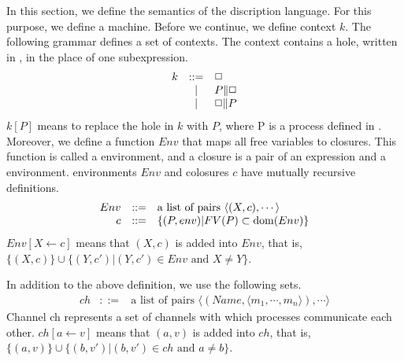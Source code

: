 In this section, we define the semantics of the discription language.
For this purpose, we define a machine.
Before we continue, we define context \(k\).
The following grammar defines a set of contexts.
The context contains a hole, written in \hole, in the place of one subexpression.
  \begin{displaymath}
    \begin{array}{lcl}
k     &::=& \mbox{$\Box$} \\
      & | & P\|\mbox{$\Box$}\\
      & | & \mbox{$\Box$}\|P
    \end{array}
  \end{displaymath}
$k[P]$ means to replace the hole in $k$ with $P$, where P is a process defined in .
Moreover, we define a function $Env$ that maps all free variables to closures.
This function is called a environment, and a closure is a pair of an expression and a environment.
environments \(Env\) and colosures \(c\) have mutually recursive definitions.
  \begin{displaymath}
    \begin{array}{rcl}
Env &::=& \mbox{a list of pairs }\langle(X,c),\cdots\rangle\\
c &::=& \{(P,env)|FV(P)\subset \mathop{\mathrm{dom}}\nolimits(Env)\}\\
    \end{array}
  \end{displaymath}
\(Env[X\leftarrow c]\) means that \((X,c)\) is added into \(Env\), that is, 
\(\{(X,c)\}\cup\{(Y,c')|(Y,c')\in Env \mbox{ and } X\neq Y\}\).

In addition to the above definition, we use the following sets.
  \begin{displaymath}
    \begin{array}{rcl}
ch &::=&\mbox{a list of pairs }\langle(Name,\langle m_1,\cdots,m_n\rangle),\cdots\rangle
    \end{array}
  \end{displaymath}
Channel ch represents a set of channels with which processes communicate each other.
\(ch[a\leftarrow v]\) means that \((a,v)\) is added into \(ch\), that is, 
\(\{(a,v)\}\cup\{(b,v')|(b,v')\in ch \mbox{ and } a\neq b\}\).

